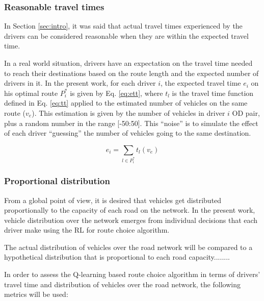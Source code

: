 \documentclass[12pt]{llncs}
\newcommand{\optRoute}[1]{\ensuremath{P_#1^*}}	%
\newcommand{\travTime}{\ensuremath{t_l}} 	%
\newcommand{\ett}[1]{\ensuremath{e_#1}}		%
\newcommand{\expVeh}{\ensuremath{v_e}}		%
\begin{document}
\subsubsection{Reasonable travel times}
In Section \ref{sec:intro}, it was said that actual travel times experienced by the drivers can be considered reasonable when they are within the expected travel time.

In a real world situation, drivers have an expectation on the travel time needed to reach their destinations based on the route length and the expected number of drivers in it. In the present work, for each driver $i$, the expected travel time $\ett{i}$ on his optimal route \optRoute{i} is given by Eq. \eqref{eq:ett}, where $\travTime$ is the travel time function defined in Eq. \eqref{eq:tt} applied to the estimated number of vehicles on the same route ($\expVeh$). This estimation is given by the number of vehicles in driver $i$ OD pair, plus a random number in the range [-50:50]. This ``noise'' is to simulate the effect of each driver ``guessing'' the number of vehicles going to the same destination.

\begin{equation}
\label{eq:ett}
\ett{i} = \sum_{l \in \optRoute{i}}\travTime(\expVeh)
\end{equation}


\subsubsection{Proportional distribution}

From a global point of view, it is desired that vehicles get distributed proportionally to the capacity of each road on the network. In the present work, vehicle distribution over the network emerges from individual decisions that each driver make using the RL for route choice algorithm. 

The actual distribution of vehicles over the road network will be compared to a hypothetical distribution that is proportional to each road capacity........%

In order to assess the Q-learning based route choice algorithm in terms of drivers' travel time and distribution of vehicles over the road network, the following metrics will be used: 
\end{document}
